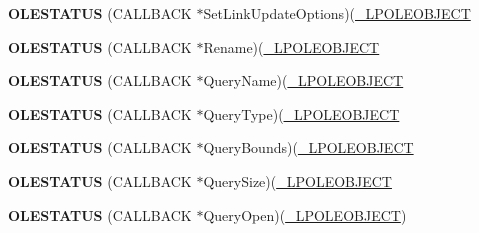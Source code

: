 \begin{DoxyCompactItemize}
\item 
\mbox{\label{struct___o_l_e_o_b_j_e_c_t_v_t_b_l_a1d8f59fdf4807f5b91325d95f339067a}} 
{\bfseries O\+L\+E\+S\+T\+A\+T\+US} (C\+A\+L\+L\+B\+A\+CK $\ast$Set\+Link\+Update\+Options)(\hyperlink{struct___o_l_e_o_b_j_e_c_t}{\+\_\+\+L\+P\+O\+L\+E\+O\+B\+J\+E\+CT}
\item 
\mbox{\label{struct___o_l_e_o_b_j_e_c_t_v_t_b_l_a24f8991daad4b02c978386bb93e92051}} 
{\bfseries O\+L\+E\+S\+T\+A\+T\+US} (C\+A\+L\+L\+B\+A\+CK $\ast$Rename)(\hyperlink{struct___o_l_e_o_b_j_e_c_t}{\+\_\+\+L\+P\+O\+L\+E\+O\+B\+J\+E\+CT}
\item 
\mbox{\label{struct___o_l_e_o_b_j_e_c_t_v_t_b_l_a089d90a1428631962485b50ff6a35e4e}} 
{\bfseries O\+L\+E\+S\+T\+A\+T\+US} (C\+A\+L\+L\+B\+A\+CK $\ast$Query\+Name)(\hyperlink{struct___o_l_e_o_b_j_e_c_t}{\+\_\+\+L\+P\+O\+L\+E\+O\+B\+J\+E\+CT}
\item 
\mbox{\label{struct___o_l_e_o_b_j_e_c_t_v_t_b_l_ab9f2027c4468e7a8b022b7c40a083545}} 
{\bfseries O\+L\+E\+S\+T\+A\+T\+US} (C\+A\+L\+L\+B\+A\+CK $\ast$Query\+Type)(\hyperlink{struct___o_l_e_o_b_j_e_c_t}{\+\_\+\+L\+P\+O\+L\+E\+O\+B\+J\+E\+CT}
\item 
\mbox{\label{struct___o_l_e_o_b_j_e_c_t_v_t_b_l_a8a43edead0f84e9fb920a9ccb0715d50}} 
{\bfseries O\+L\+E\+S\+T\+A\+T\+US} (C\+A\+L\+L\+B\+A\+CK $\ast$Query\+Bounds)(\hyperlink{struct___o_l_e_o_b_j_e_c_t}{\+\_\+\+L\+P\+O\+L\+E\+O\+B\+J\+E\+CT}
\item 
\mbox{\label{struct___o_l_e_o_b_j_e_c_t_v_t_b_l_a886763c8a2a9f3cb1619ad56302f0adb}} 
{\bfseries O\+L\+E\+S\+T\+A\+T\+US} (C\+A\+L\+L\+B\+A\+CK $\ast$Query\+Size)(\hyperlink{struct___o_l_e_o_b_j_e_c_t}{\+\_\+\+L\+P\+O\+L\+E\+O\+B\+J\+E\+CT}
\item 
\mbox{\label{struct___o_l_e_o_b_j_e_c_t_v_t_b_l_aedb2c7f41286e0343b4bf411515f6ae1}} 
{\bfseries O\+L\+E\+S\+T\+A\+T\+US} (C\+A\+L\+L\+B\+A\+CK $\ast$Query\+Open)(\hyperlink{struct___o_l_e_o_b_j_e_c_t}{\+\_\+\+L\+P\+O\+L\+E\+O\+B\+J\+E\+CT})
\item 

\end{DoxyCompactItemize}
